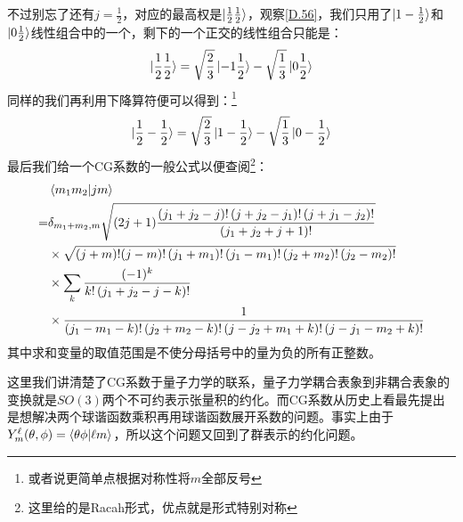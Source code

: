 不过别忘了还有$j=\frac{1}{2}$，对应的最高权是$\ket{\frac{1}{2}\frac{1}{2}}$，观察\ref{D.56}，我们只用了$\ket{1-\frac{1}{2}}$和$\ket{0\frac{1}{2}}$线性组合中的一个，剩下的一个正交的线性组合只能是：
\[\ket{\frac{1}{2}\frac{1}{2}}=\sqrt{\frac{2}{3}}\ket{-1\frac{1}{2}}-\sqrt{\frac{1}{3}}\ket{0\frac{1}{2}}\]
同样的我们再利用下降算符便可以得到：\footnote{或者说更简单点根据对称性将$m$全部反号}
\[\ket{\frac{1}{2}-\frac{1}{2}}=\sqrt{\frac{2}{3}}\ket{1-\frac{1}{2}}-\sqrt{\frac{1}{3}}\ket{0-\frac{1}{2}}\]
最后我们给一个CG系数的一般公式以便查阅\footnote{这里给的是Racah形式，优点就是形式特别对称}：
\begin{equation}
	\begin{aligned}
		& \braket{ m_{1} m_{2} | j m}\\
		= & \delta_{m_{1}+m_{2}, m} \sqrt{(2 j+1) \frac{\left(j_{1}+j_{2}-j\right) !\left(j+j_{2}-j_{1}\right) !\left(j+j_{1}-j_{2}\right) !}{\left(j_{1}+j_{2}+j+1\right) !}} \\
		& \times \sqrt{(j+m) !(j-m) !\left(j_{1}+m_{1}\right) !\left(j_{1}-m_{1}\right) !\left(j_{2}+m_{2}\right) !\left(j_{2}-m_{2}\right) !} \\
		& \times \sum_{k} \frac{(-1)^{k}}{k !\left(j_{1}+j_{2}-j-k\right) !} \\
		& \times \frac{1}{\left(j_{1}-m_{1}-k\right) !\left(j_{2}+m_{2}-k\right) !\left(j-j_{2}+m_{1}+k\right) !\left(j-j_{1}-m_{2}+k\right) !}
	\end{aligned}
\end{equation}
其中求和变量的取值范围是不使分母括号中的量为负的所有正整数。

这里我们讲清楚了CG系数于量子力学的联系，量子力学耦合表象到非耦合表象的变换就是$SO(3)$两个不可约表示张量积的约化。而CG系数从历史上看最先提出是想解决两个球谐函数乘积再用球谐函数展开系数的问题。事实上由于$Y^\ell_m(\theta,\phi)=\braket{\theta\phi|\ell m}$，所以这个问题又回到了群表示的约化问题。